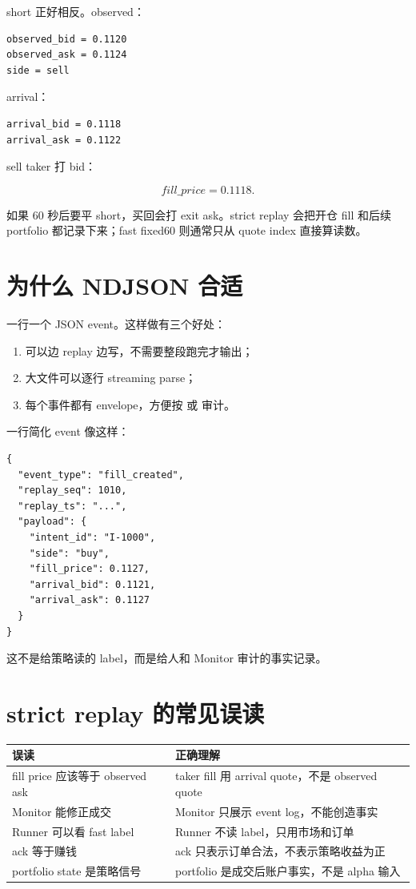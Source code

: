 short 正好相反。observed：

\begin{lstlisting}
observed_bid = 0.1120
observed_ask = 0.1124
side = sell
\end{lstlisting}

arrival：

\begin{lstlisting}
arrival_bid = 0.1118
arrival_ask = 0.1122
\end{lstlisting}

sell taker 打 bid：

\[
fill\_price=0.1118.
\]

如果 60 秒后要平 short，买回会打 exit ask。strict replay 会把开仓 fill 和后续 portfolio 都记录下来；fast fixed60 则通常只从 quote index 直接算读数。

\section{为什么 NDJSON 合适}

 一行一个 JSON event。这样做有三个好处：

\begin{enumerate}[leftmargin=2em]
  \item 可以边 replay 边写，不需要整段跑完才输出；
  \item 大文件可以逐行 streaming parse；
  \item 每个事件都有 envelope，方便按  或  审计。
\end{enumerate}

一行简化 event 像这样：

\begin{lstlisting}
{
  "event_type": "fill_created",
  "replay_seq": 1010,
  "replay_ts": "...",
  "payload": {
    "intent_id": "I-1000",
    "side": "buy",
    "fill_price": 0.1127,
    "arrival_bid": 0.1121,
    "arrival_ask": 0.1127
  }
}
\end{lstlisting}

这不是给策略读的 label，而是给人和 Monitor 审计的事实记录。

\section{strict replay 的常见误读}

\begin{longtable}{p{}p{}}
\toprule
误读 & 正确理解 \\
\midrule
fill price 应该等于 observed ask & taker fill 用 arrival quote，不是 observed quote \\
Monitor 能修正成交 & Monitor 只展示 event log，不能创造事实 \\
Runner 可以看 fast label & Runner 不读 label，只用市场和订单 \\
ack 等于赚钱 & ack 只表示订单合法，不表示策略收益为正 \\
portfolio state 是策略信号 & portfolio 是成交后账户事实，不是 alpha 输入 \\
\bottomrule
\end{longtable}

